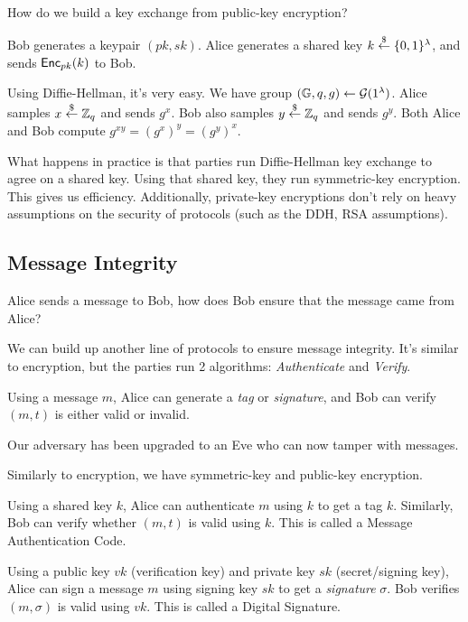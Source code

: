 \begin{ques*}
    How do we build a key exchange from public-key encryption?
\end{ques*}
Bob generates a keypair $(pk, sk)$. Alice generates a shared key $k\overset{\$}{\leftarrow} \{0, 1\}^\lambda$, and sends $\operatorname{\mathsf{Enc}}_{pk}(k)$ to Bob.

Using Diffie-Hellman, it's very easy. We have group $(\mathbb G, q, g)\leftarrow \mathcal{G}(1^\lambda)$. Alice samples $x\overset{\$}{\leftarrow} \mathbb Z_q$ and sends $g^x$. Bob also samples $y\overset{\$}{\leftarrow} \mathbb Z_q$ and sends $g^y$. Both Alice and Bob compute $g^{xy} = (g^x)^y = (g^y)^x$.


What happens in practice is that parties run Diffie-Hellman key exchange to agree on a shared key. Using that shared key, they run symmetric-key encryption. This gives us efficiency. Additionally, private-key encryptions don't rely on heavy assumptions on the security of protocols (such as the DDH, RSA assumptions).

\subsection{Message Integrity}
Alice sends a message to Bob, how does Bob ensure that the message came from Alice?


We can build up another line of protocols to ensure message integrity. It's similar to encryption, but the parties run 2 algorithms: \emph{Authenticate} and \emph{Verify}.

Using a message $m$, Alice can generate a \emph{tag} or \emph{signature}, and Bob can verify $(m, t)$ is either valid or invalid.

Our adversary has been upgraded to an Eve who can now tamper with messages.

Similarly to encryption, we have symmetric-key and public-key encryption.

Using a shared key $k$, Alice can authenticate $m$ using $k$ to get a tag $k$. Similarly, Bob can verify whether $(m, t)$ is valid using $k$. This is called a Message Authentication Code.


Using a public key $vk$ (verification key) and private key $sk$ (secret/signing key), Alice can sign a message $m$ using signing key $sk$ to get a \emph{signature} $\sigma$. Bob verifies $(m, \sigma)$ is valid using $vk$. This is called a Digital Signature.

